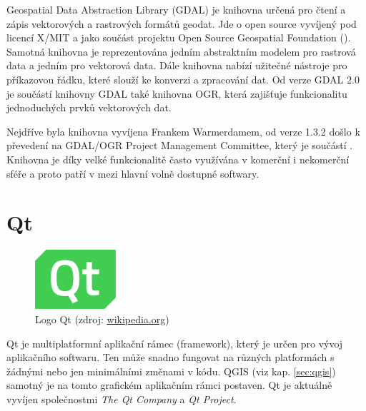 Geospatial Data Abstraction Library (GDAL) je knihovna určená pro čtení
a zápis vektorových a rastrových formátů geodat. Jde o open source
vyvíjený pod licencí X/MIT a jako součást projektu Open Source
Geospatial Foundation (). Samotná knihovna je reprezentována
jedním abstraktním modelem pro rastrová data a jedním pro vektorová
data. Dále knihovna nabízí užitečné nástroje pro příkazovou řádku,
které slouží ke konverzi a zpracování dat. Od verze GDAL 2.0 je
součástí knihovny GDAL také knihovna OGR, která zajišťuje
funkcionalitu jednoduchých prvků vektorových dat.

Nejdříve byla knihovna vyvíjena Frankem Warmerdamem, od verze 1.3.2
došlo k převedení na GDAL/OGR Project Management Committee, který je
součástí . Knihovna je díky velké funkcionalitě často
využívána v komerční i nekomerční sféře a proto patří v  mezi
hlavní volně dostupné softwary. \cite{gdal, gdal_wiki}

\section{Qt}

\begin{figure}[H]
	 \centering
      \includegraphics[width=3cm]{./pictures/qt-logo.png}
      \caption{Logo Qt (zdroj:
\href{https://upload.wikimedia.org/wikipedia/commons/thumb/0/0b/Qt_logo_2016.svg/578px-Qt_logo_2016.svg.png}{wikipedia.org})}
      \label{fig:qt}
  \end{figure}

  Qt je multiplatformní aplikační rámec (framework), který je určen
  pro vývoj aplikačního softwaru. Ten může snadno fungovat na různých
  platformách s žádnými nebo jen minimálními změnami v kódu. QGIS (viz
  kap. \ref{sec:qgis}) samotný je na tomto grafickém aplikačním rámci
  postaven. Qt je aktuálně vyvíjen společnostmi \textit{The Qt
    Company} a \textit{Qt Project}.\cite{qt_wiki, qt}


